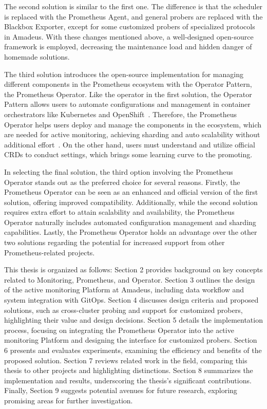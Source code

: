 The second solution is similar to the first one. The difference is that the scheduler is replaced with the Prometheus Agent, and general probers are replaced with the Blackbox Exporter, except for some customized probers of specialized protocols in Amadeus. With these changes mentioned above, a well-designed open-source framework is employed, decreasing the maintenance load and hidden danger of homemade solutions. 

The third solution introduces the open-source implementation for managing different components in the Prometheus ecosystem with the Operator Pattern, the Prometheus Operator. Like the operator in the first solution, the Operator Pattern allows users to automate configurations and management in container orchestrators like Kubernetes and OpenShift~\parencite{kubernetesOperatorPattern}. Therefore, the Prometheus Operator helps users deploy and manage the components in the ecosystem, which are needed for active monitoring, achieving sharding and auto scalability without additional effort~\parencite{prometheusoperatorIntroduction2020}. On the other hand, users must understand and utilize official \ac{CRD}s to conduct settings, which brings some learning curve to the promoting. 

In selecting the final solution, the third option involving the Prometheus Operator stands out as the preferred choice for several reasons. Firstly, the Prometheus Operator can be seen as an enhanced and official version of the first solution, offering improved compatibility. Additionally, while the second solution requires extra effort to attain scalability and availability, the Prometheus Operator naturally includes automated configuration management and sharding capabilities. Lastly, the Prometheus Operator holds an advantage over the other two solutions regarding the potential for increased support from other Prometheus-related projects.

This thesis is organized as follows: Section 2 provides background on key concepts related to Monitoring, Prometheus, and Operator. Section 3 outlines the design of the active monitoring Platform at Amadeus, including data workflow and system integration with GitOps. Section 4 discusses design criteria and proposed solutions, such as cross-cluster probing and support for customized probers, highlighting their value and design decisions. Section 5 details the implementation process, focusing on integrating the Prometheus Operator into the active monitoring Platform and designing the interface for customized probers. Section 6 presents and evaluates experiments, examining the efficiency and benefits of the proposed solution. Section 7 reviews related work in the field, comparing this thesis to other projects and highlighting distinctions. Section 8 summarizes the implementation and results, underscoring the thesis's significant contributions. Finally, Section 9 suggests potential avenues for future research, exploring promising areas for further investigation. 


